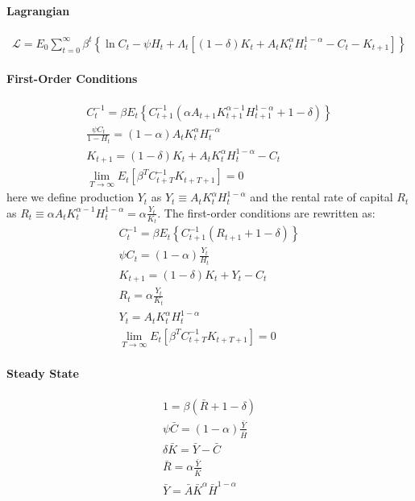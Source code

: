 \documentclass[a4j, dvipdfmx]{jarticle}
\begin{document}
\begin{appendix}
\paragraph{Lagrangian}
\begin{align*}
\mathcal{L} = E_0 \sum_{t=0}^\infty \beta^t \left\{\ln C_t - \psi H_t + \Lambda_t \left[(1-\delta) K_t + A_t K_t^\alpha H_t^{1-\alpha} - C_t - K_{t+1}\right]\right\}
\end{align*}

\paragraph{First-Order Conditions}
\begin{align*}
C_t^{-1} = \beta E_t \left\{C_{t+1}^{-1} \left(\alpha A_{t+1} K_{t+1}^{\alpha-1}H_{t+1}^{1-\alpha} + 1 - \delta\right)\right\}\\
\frac{\psi C_t}{1-H_t} = (1-\alpha) A_t K_t^\alpha H_t^{-\alpha}\\
K_{t+1} = (1-\delta) K_t + A_tK_t^\alpha H_t^{1-\alpha} - C_t\\
\lim_{T\to\infty} E_t [\beta^T C_{t+T}^{-1} K_{t+T+1}] = 0
\end{align*}
here we define production $Y_t$ as $Y_t \equiv A_tK_t^\alpha H_t^{1-\alpha}$ and the rental rate of capital $R_t$ as $R_t \equiv \alpha A_t K_t^{\alpha-1}H_t^{1-\alpha} = \alpha \frac{Y_t}{K_t}$. The first-order conditions are rewritten as:
\begin{align*}
C_t^{-1} = \beta E_t \left\{C_{t+1}^{-1} \left(R_{t+1} + 1 - \delta\right)\right\}\\
\psi C_t = (1-\alpha) \frac{Y_t}{H_t}\\
K_{t+1} = (1-\delta) K_t + Y_t - C_t\\
R_t = \alpha \frac{Y_t}{K_t}\\
Y_t = A_t K_t^\alpha H_t^{1-\alpha}\\
\lim_{T\to\infty} E_t [\beta^T C_{t+T}^{-1} K_{t+T+1}] = 0
\end{align*}

\paragraph{Steady State}
\begin{align*}
1 = \beta (\bar R + 1 - \delta)\\
\psi \bar C = (1-\alpha) \frac{\bar Y}{\bar H}\\
\delta \bar K = \bar Y - \bar C\\
\bar R = \alpha \frac{\bar Y}{\bar K}\\
\bar Y = \bar A \bar K^\alpha \bar H^{1-\alpha}
\end{align*}


\end{appendix}
\end{document}

